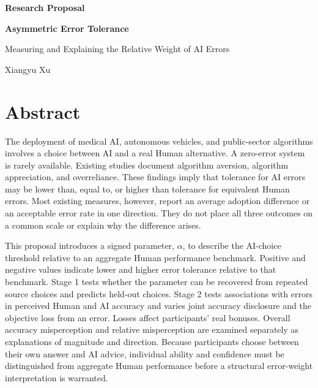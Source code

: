 \documentclass[11pt,a4paper]{article}
\begin{document}
\begin{titlepage}
\centering
\vspace*{2.5cm}
{\sffamily\bfseries\color{navy}\LARGE Research Proposal\par}
\vspace{1.2cm}
{\sffamily\bfseries\Huge Asymmetric Error Tolerance\par}
\vspace{0.35cm}
{\sffamily\Large Measuring and Explaining the Relative Weight of AI Errors\par}
\vspace{1.5cm}
{\sffamily\Large Xiangyu Xu\par}
\vspace{0.8cm}

\vfill
\end{titlepage}

\section*{Abstract}

The deployment of medical AI, autonomous vehicles, and public-sector algorithms involves a choice between AI and a real Human alternative. A zero-error system is rarely available. Existing studies document algorithm aversion, algorithm appreciation, and overreliance. These findings imply that tolerance for AI errors may be lower than, equal to, or higher than tolerance for equivalent Human errors. Most existing measures, however, report an average adoption difference or an acceptable error rate in one direction. They do not place all three outcomes on a common scale or explain why the difference arises.

This proposal introduces a signed parameter, $\alpha$, to describe the AI-choice threshold relative to an aggregate Human performance benchmark. Positive and negative values indicate lower and higher error tolerance relative to that benchmark. Stage 1 tests whether the parameter can be recovered from repeated source choices and predicts held-out choices. Stage 2 tests associations with errors in perceived Human and AI accuracy and varies joint accuracy disclosure and the objective loss from an error. Losses affect participants' real bonuses. Overall accuracy misperception and relative misperception are examined separately as explanations of magnitude and direction. Because participants choose between their own answer and AI advice, individual ability and confidence must be distinguished from aggregate Human performance before a structural error-weight interpretation is warranted.
\end{document}
